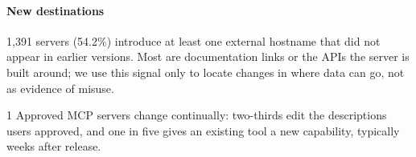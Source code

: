 \paragraph{New destinations}
1,391 servers (54.2\%) introduce at least one external hostname that did not appear in earlier versions. Most are documentation links or the APIs the server is built around; we use this signal only to locate changes in where data can go, not as evidence of misuse.

\begin{finding}{1}
Approved MCP servers change continually: two-thirds edit the descriptions users approved, and one in five gives an existing tool a new capability, typically weeks after release.
\end{finding}
